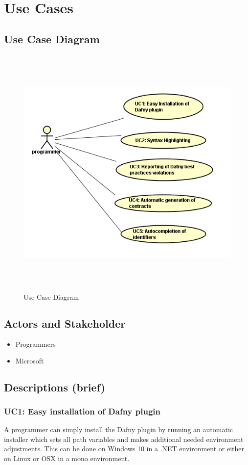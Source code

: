 \section{Use Cases}
\subsection{Use Case Diagram}
\begin{figure}[h]
	\centering
	\includegraphics[width=1\linewidth, height=5in]{"./img/UseCase"}
	\caption{Use Case Diagram}
	\label{fig:usecase-diagram}
\end{figure}
\subsection{Actors and Stakeholder}
\begin{itemize}
	\item Programmers
	\item Microsoft
\end{itemize}
\subsection{Descriptions (brief)}
\subsubsection{UC1: Easy installation of Dafny plugin}
A programmer can simply install the Dafny plugin by running an automatic installer which sets all path variables and makes additional needed environment adjustments. This can be done on Windows 10 in a .NET environment or either on Linux or OSX in a mono environment.
